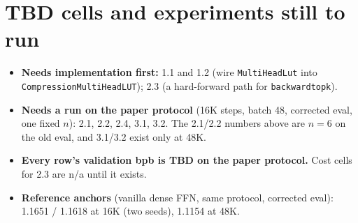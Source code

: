 \documentclass[10pt]{article}
\newcommand{\code}[1]{{\renewcommand{\_}{\textunderscore\allowbreak}\texttt{#1}}}
\begin{document}
\section*{TBD cells and experiments still to run}
\begin{itemize}\setlength\itemsep{1pt}
\item \textbf{Needs implementation first:} 1.1 and 1.2 (wire \code{MultiHeadLut} into \code{CompressionMultiHeadLUT}); 2.3 (a hard-forward path for \code{backward\_topk}).
\item \textbf{Needs a run on the paper protocol} (16K steps, batch 48, corrected eval, one fixed $n$): 2.1, 2.2, 2.4, 3.1, 3.2. The 2.1/2.2 numbers above are $n=6$ on the old eval, and 3.1/3.2 exist only at 48K.
\item \textbf{Every row's validation bpb is TBD on the paper protocol.} Cost cells for 2.3 are n/a until it exists.
\item \textbf{Reference anchors} (vanilla dense FFN, same protocol, corrected eval): 1.1651 / 1.1618 at 16K (two seeds), 1.1154 at 48K.
\end{itemize}
\end{document}

